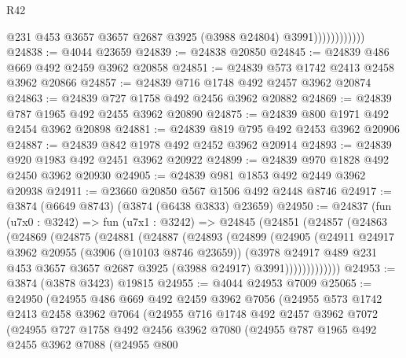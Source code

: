 \begin{lexlean}{R42}
\begin{coremodule}
                            @231
                            @453
                            @3657
                            @3657
                            @2687
                            @3925
                            (@3988 @24804)
                            @3991))))))))))))
@24838 := @4044 @23659
@24839 := @24838 @20850
@24845 := @24839 @486 @669 @492 @2459 @3962 @20858
@24851 := @24839 @573 @1742 @2413 @2458 @3962 @20866
@24857 := @24839 @716 @1748 @492 @2457 @3962 @20874
@24863 := @24839 @727 @1758 @492 @2456 @3962 @20882
@24869 := @24839 @787 @1965 @492 @2455 @3962 @20890
@24875 := @24839 @800 @1971 @492 @2454 @3962 @20898
@24881 := @24839 @819 @795 @492 @2453 @3962 @20906
@24887 := @24839 @842 @1978 @492 @2452 @3962 @20914
@24893 := @24839 @920 @1983 @492 @2451 @3962 @20922
@24899 := @24839 @970 @1828 @492 @2450 @3962 @20930
@24905 := @24839 @981 @1853 @492 @2449 @3962 @20938
@24911 := @23660 @20850 @567 @1506 @492 @2448 @8746
@24917 := @3874 (@6649 @8743) (@3874 (@6438 @3833) @23659)
@24950 := @24837
    (fun (u7x0 : @3242) =>
    fun (u7x1 : @3242) =>
    @24845
      (@24851
        (@24857
          (@24863
            (@24869
              (@24875
                (@24881
                  (@24887
                    (@24893
                      (@24899
                        (@24905
                          (@24911
                            @24917
                            @3962
                            @20955
                            (@3906 (@10103 @8746 @23659))
                            (@3978
                              @24917
                              @489
                              @231
                              @453
                              @3657
                              @3657
                              @2687
                              @3925
                              (@3988 @24917)
                              @3991)))))))))))))
@24953 := @3874 (@3878 @3423) @19815
@24955 := @4044 @24953 @7009
@25065 := @24950
    (@24955
      @486
      @669
      @492
      @2459
      @3962
      @7056
      (@24955
        @573
        @1742
        @2413
        @2458
        @3962
        @7064
        (@24955
          @716
          @1748
          @492
          @2457
          @3962
          @7072
          (@24955
            @727
            @1758
            @492
            @2456
            @3962
            @7080
            (@24955
              @787
              @1965
              @492
              @2455
              @3962
              @7088
              (@24955
                @800

\end{coremodule}
\end{lexlean}
